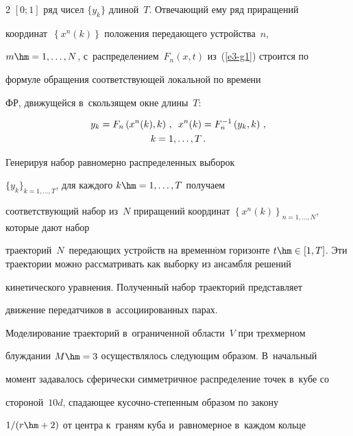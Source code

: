 \begin{multicols}{2}
$[0;1]$ ряд чисел $\{y_k\}$ длиной~$T$. Отвечающий ему ряд приращений 


координат~$\left\{ x^n(k)\right\}$ положения передающего устройства~$n$, 


$m\hm=1,\ldots ,N$, с~распределением~$F_n(x,t)$ из~(\ref{e3-g1}) строится по 


формуле обращения соответствующей локальной по времени 


ФР, движущейся в~скользящем окне длины~$T$:


  \begin{multline}


  y_k=F_n\left (x^n(k),k\right)\,,\enskip  


  x^n(k)=F_n^{-1} \left( y_k,k\right)\,,\\


   k=1,\ldots, T\,.


  \label{e4-g1}


  \end{multline}


  


  Генерируя набор равномерно распределенных выборок  


$\{y_k\}_{k=1,\ldots, T}$, для каждого $k\hm=1,\ldots, T$ получаем 


соответствующий набор из~$N$ приращений координат $\left\{ 


x^n(k)\right\}_{n=1,\ldots, N}$, которые дают набор 


траекторий~$N$~передающих устройств на временн$\acute{\mbox{о}}$м горизонте $t\hm\in 


[1,T]$. Эти траектории можно рас\-смат\-ри\-вать как выборку из ансамбля решений 


кинетического уравнения. Полученный набор траекторий представляет 


движение передатчиков в~ассоциирован\-ных парах. 


  


  Моделирование траекторий в~ограниченной области~$V$ при трехмерном 


блуждании $M\hm=3$ осуществлялось следующим образом. В~начальный 


момент задавалось сферически симметричное распределение точек в~кубе со 


стороной~$10d$, спа\-да\-ющее ку\-соч\-но-сте\-пен\-ным образом по закону 


$1/(r\hm+2)$ от центра к~граням куба и~равномерное в~каждом кольце 



\end{multicols}
